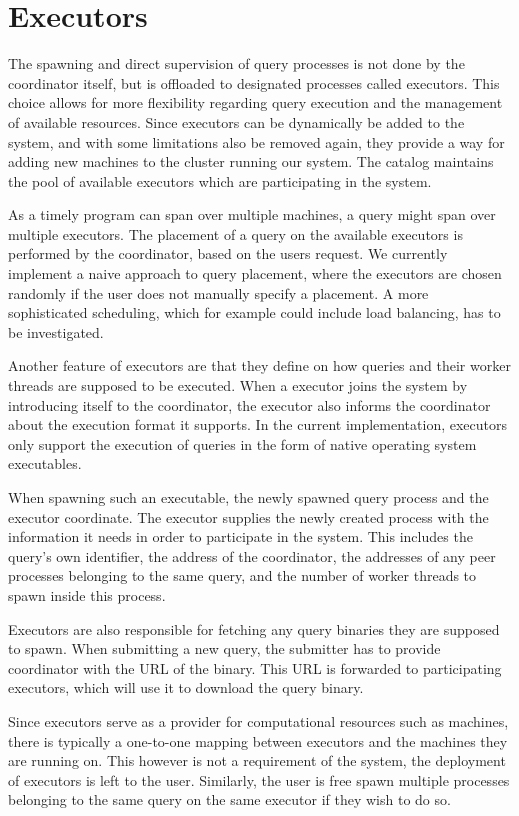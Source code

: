 \section{Executors}

The spawning and direct supervision of query processes is not done by the
coordinator itself, but is offloaded to designated processes called executors.
This choice allows for more flexibility regarding query execution and the
management of available resources. Since executors can be dynamically be added
to the system, and with some limitations also be removed again, they provide
a way for adding new machines to the cluster running our system. The catalog
maintains the pool of available executors which are participating in the system.

As a timely program can span over multiple machines, a query might span
over multiple executors. The placement of a query on the available executors
is performed by the coordinator, based on the users request.
We currently implement a naive approach to query placement, where the executors
are chosen randomly if the user does not manually specify a placement. A more
sophisticated scheduling, which for example could include load balancing,
has to be investigated.

Another feature of executors are that they define on how queries and their
worker threads are supposed to be executed. When a executor joins
the system by introducing itself to the coordinator, the executor also informs
the coordinator about the execution format it supports. In the current
implementation, executors only support the execution of queries in the form of
native operating system executables.

When spawning such an executable, the newly spawned query process and the
executor coordinate. The executor supplies the newly created process with the information
it needs in order to participate in the system. This includes the query's own identifier,
the address of the coordinator, the addresses of any peer processes belonging to the 
same query, and the number of worker threads to spawn inside this process.

Executors are also responsible for fetching any query binaries they are supposed
to spawn. When submitting a new query, the submitter has to provide coordinator
with the URL of the binary. This URL is forwarded to participating executors,
which will use it to download the query binary. 

Since executors serve as a provider for computational resources such as machines,
there is typically a one-to-one mapping between executors and the machines they
are running on. This however is not a requirement of the system, the deployment of
executors is left to the user. Similarly, the user is free spawn multiple
processes belonging to the same query on the same executor if they wish to do so.


